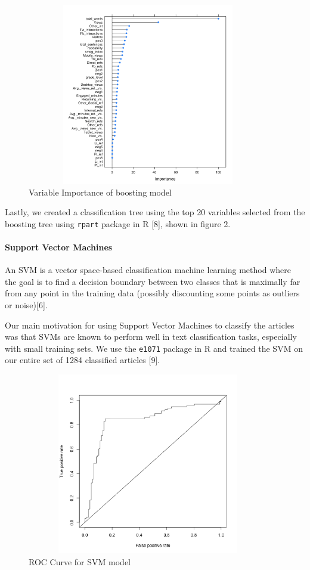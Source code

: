 \documentclass[10pt,letterpaper]{article}
\begin{document}
\begin{figure}
\includegraphics[width=400px,height=300px]{boost_VarImp} \caption{Variable Importance of boosting model}\label{fig:unnamed-chunk-4}
\end{figure}

Lastly, we created a classification tree using the top 20 variables
selected from the boosting tree using \texttt{rpart} package in R
{[}8{]}, shown in figure 2.

\hypertarget{support-vector-machines}{%
\paragraph{Support Vector Machines}\label{support-vector-machines}}

An SVM is a vector space-based classification machine learning method
where the goal is to find a decision boundary between two classes that
is maximally far from any point in the training data (possibly
discounting some points as outliers or noise){[}6{]}.

Our main motivation for using Support Vector Machines to classify the
articles was that SVMs are known to perform well in text classification
tasks, especially with small training sets. We use the \texttt{e1071}
package in R and trained the SVM on our entire set of 1284 classified
articles {[}9{]}.

\begin{figure}
\includegraphics[width=400px,height=300px]{roc-curve} \caption{ROC Curve for SVM model}\label{fig:unnamed-chunk-5}
\end{figure}
\end{document}
